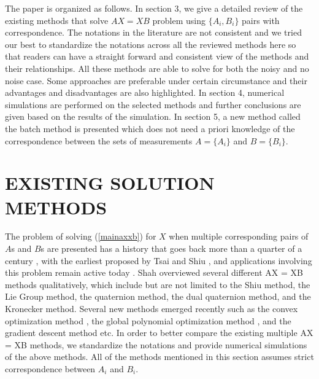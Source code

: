 \documentclass[twocolumn,10pt]{asme2ej}
\begin{document}
%
%
The paper is organized as follows. In section 3, we give a detailed review of the existing methods that solve $AX=XB$ problem using $\{A_{i}, B_{i}\}$ pairs with correspondence. The notations in the literature are not consistent and we tried our best to standardize the notations across all the reviewed methods here so that readers can have a straight forward and consistent view of the methods and their relationships. All these methods are able to solve for both the noisy and no noise case. Some approaches are preferable under certain circumstance and their advantages and disadvantages are also highlighted. In section 4, numerical simulations are performed on the selected methods and further conclusions are given based on the results of the simulation. In section 5, a new method called the batch method is presented which does not need a priori knowledge of the correspondence between the sets of measurements $A = \{A_{i}\}$ and $B = \{B_{i}\}$.   

\section{EXISTING SOLUTION METHODS}
 
The problem of solving (\ref{mainaxxb}) for $X$ when multiple corresponding pairs of $A$s and $B$s are presented has a history that goes back more than a quarter of a century
\cite{arun,chou1991finding, park1994robot,shiu1989calibration}, with the earliest proposed by Tsai \cite{tsai1989new} and Shiu \cite{shiu1989calibration}, and applications involving this problem remain active today \cite{dong,kim,dai}. Shah \cite{shah2012overview} overviewed several different AX = XB methods qualitatively, which include but are not limited to the Shiu method, the Lie Group method, the quaternion method, the dual quaternion method, and the Kronecker method. Several new methods emerged recently such as the convex optimization method \cite{zhao2011hand}, the global polynomial optimization method \cite{heller2014hand}, and the gradient descent method \cite{ackerman2014online} etc.
In order to better compare the existing multiple AX = XB methods, we standardize the notations and provide numerical simulations of the above methods. All of the methods mentioned in this section assumes strict correspondence between $A_{i}$ and $B_{i}$.
\end{document}
